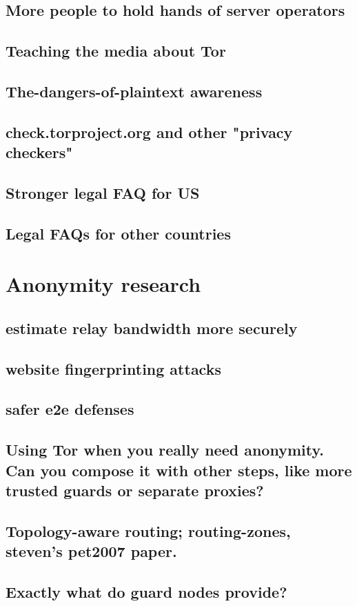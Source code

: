 \documentclass{article}
\begin{document}
\subsection{More people to hold hands of server operators}
\subsection{Teaching the media about Tor}
\subsection{The-dangers-of-plaintext awareness}
\subsection{check.torproject.org and other "privacy checkers"}
\subsection{Stronger legal FAQ for US}
\subsection{Legal FAQs for other countries}
\section{Anonymity research}
\subsection{estimate relay bandwidth more securely}
\subsection{website fingerprinting attacks}
\subsection{safer e2e defenses}
\subsection{Using Tor when you really need anonymity. Can you compose it
      with other steps, like more trusted guards or separate proxies?}
\subsection{Topology-aware routing; routing-zones, steven's pet2007 paper.}
\subsection{Exactly what do guard nodes provide?}
\end{document}
